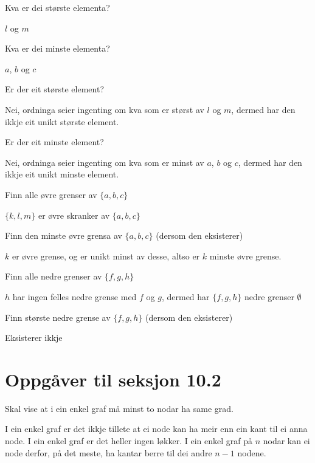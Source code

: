 \documentclass[a4paper, 11pt]{article}
\newcommand{\Themecolor}{Black} %
\newcommand{\Themetext}[1]{\textcolor{\Themecolor}{#1}}
\newcommand{\Task}[1]{
  \noindent {{\bf \Themetext{#1:}}}
}
\newcommand{\MajorTask}[1]{
  \vspace{5mm}
  \reversemarginpar
  \marginnote{\LARGE\bfseries \Themetext{#1}}
}
\begin{document}
\begin{minipage}{.45\textwidth}
  \Task{a} Kva er dei største elementa?

  \(l\) og \(m\)

  \vspace{2mm}
  \Task{b} Kva er dei minste elementa?

  \(a\), \(b\) og \(c\)

  \vspace{2mm}
  \Task{c} Er der eit største element?

  Nei, ordninga seier ingenting om kva som er størst av \(l\) og \(m\),
  dermed har den ikkje eit unikt største element.

  \vspace{2mm}
  \Task{d} Er der eit minste element?

  Nei, ordninga seier ingenting om kva som er minst av \(a\), \(b\) og \(c\),
  dermed har den ikkje eit unikt minste element.

  \vspace{2mm}
  \Task{e} Finn alle øvre grenser av \(\{a,b,c\}\)

  \(\{k,l,m\}\) er øvre skranker av \(\{a,b,c\}\)

\end{minipage}

\Task{f} Finn den minste øvre grensa av \(\{a,b,c\}\) (dersom den eksisterer)

\noindent
\(k\) er øvre grense, og er unikt minst av desse, altso er \(k\) minste
øvre grense.

\vspace{2mm}
\Task{g} Finn alle nedre grenser av \(\{f,g,h\}\)

\noindent
\(h\) har ingen felles nedre grense med \(f\) og \(g\), dermed har \(\{f,g,h\}\)
nedre grenser \(\emptyset\)

\vspace{2mm}
\Task{h} Finn største nedre grense av \(\{f,g,h\}\) (dersom den eksisterer)

\noindent
Eksisterer ikkje


\section*{Oppgåver til seksjon 10.2} \vspace{-5mm}
\MajorTask{18} \noindent
Skal vise at i ein enkel graf må minst to nodar ha same grad.

\vspace{3mm}\noindent
I ein enkel graf er det ikkje tillete at ei node kan ha meir enn ein kant
til ei anna node. I ein enkel graf er det heller ingen løkker.
I ein enkel graf på \(n\) nodar kan ei node derfor, på det meste, ha kantar
berre til dei andre \(n-1\) nodene.
\end{document}
